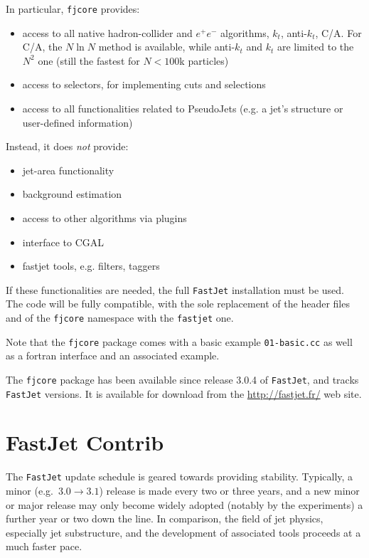 \documentclass[12pt,a4]{article}
\newcommand{\fastjet}{\texttt{FastJet}\xspace}
\newcommand{\fjcore}{\texttt{fjcore}\xspace}
\newcommand{\ttt}[1]{{\small\texttt{#1}}}
\begin{document}
In particular, \ttt{fjcore} provides:
\begin{itemize}
\item access to all native hadron-collider and $e^+e^-$ algorithms,
  $k_t$, anti-$k_t$, C/A.  For C/A, the $N\ln N$ method is available,
  while anti-$k_t$ and $k_t$ are limited to the $N^2$ one (still the
  fastest for $N < 100$k particles)
  \item access to selectors, for implementing cuts and selections
  \item access to all functionalities related to PseudoJets (e.g. a jet's
    structure or user-defined information)
\end{itemize}
Instead, it does \emph{not} provide:
\begin{itemize}
  \item jet-area functionality
  \item background estimation
  \item access to other algorithms via plugins
  \item interface to CGAL
  \item fastjet tools, e.g. filters, taggers
\end{itemize}
%
If these functionalities are needed, the full \fastjet installation must be
used. The code will be fully compatible, with the sole replacement of the
header files and of the \ttt{fjcore} namespace with the \ttt{fastjet} one.

Note that the \fjcore package comes with a basic example
\ttt{01-basic.cc} as well as a fortran interface and an associated
example.

The \fjcore package has been available since release 3.0.4 of
\fastjet, and tracks \fastjet versions.
%
It is available for download from the \url{http://fastjet.fr/} web
site.

\section{FastJet Contrib}
\label{sec:fjcontrib}

The \fastjet update schedule is geared towards providing stability.
%
Typically, a minor (e.g.\ $3.0 \to 3.1$) release is made every two or
three years, and a new minor or major release may only become widely
adopted (notably by the experiments) a further year or two down the
line.
%
In comparison, the field of jet physics, especially jet substructure,
and the development of associated tools proceeds at a much faster pace.
\end{document}
